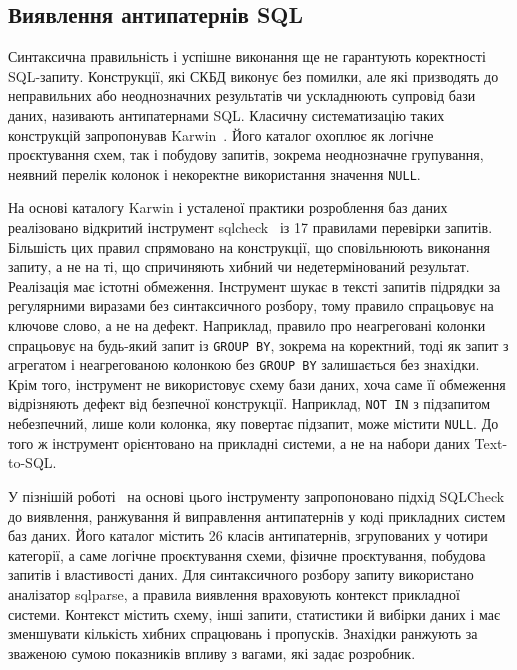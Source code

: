 \documentclass[a4paper,14pt,oneside]{extreport}
\begin{document}
\subsection{Виявлення антипатернів SQL}
\label{subsec:antipatterns}

Синтаксична правильність і успішне виконання ще не гарантують коректності SQL-запиту. Конструкції, які СКБД виконує без помилки, але які призводять до неправильних або неоднозначних результатів чи ускладнюють супровід бази даних, називають антипатернами SQL. Класичну систематизацію таких конструкцій запропонував Karwin~\cite{karwin2010sqlantipatterns}. Його каталог охоплює як логічне проєктування схем, так і побудову запитів, зокрема неоднозначне групування, неявний перелік колонок і некоректне використання значення \texttt{NULL}.

На основі каталогу Karwin і усталеної практики розроблення баз даних реалізовано відкритий інструмент sqlcheck~\cite{sqlcheckRepo} із 17 правилами перевірки запитів. Більшість цих правил спрямовано на конструкції, що сповільнюють виконання запиту, а не на ті, що спричиняють хибний чи недетермінований результат. Реалізація має істотні обмеження. Інструмент шукає в тексті запитів підрядки за регулярними виразами без синтаксичного розбору, тому правило спрацьовує на ключове слово, а не на дефект. Наприклад, правило про неагреговані колонки спрацьовує на будь-який запит із \texttt{GROUP~BY}, зокрема на коректний, тоді як запит з агрегатом і неагрегованою колонкою без \texttt{GROUP~BY} залишається без знахідки. Крім того, інструмент не використовує схему бази даних, хоча саме її обмеження відрізняють дефект від безпечної конструкції. Наприклад, \texttt{NOT~IN} з підзапитом небезпечний, лише коли колонка, яку повертає підзапит, може містити \texttt{NULL}. До того ж інструмент орієнтовано на прикладні системи, а не на набори даних Text-to-SQL.

У пізнішій роботі~\cite{dintyala2020sqlcheck} на основі цього інструменту запропоновано підхід SQLCheck до виявлення, ранжування й виправлення антипатернів у коді прикладних систем баз даних. Його каталог містить 26 класів антипатернів, згрупованих у чотири категорії, а саме логічне проєктування схеми, фізичне проєктування, побудова запитів і властивості даних. Для синтаксичного розбору запиту використано аналізатор sqlparse, а правила виявлення враховують контекст прикладної системи. Контекст містить схему, інші запити, статистики й вибірки даних і має зменшувати кількість хибних спрацювань і пропусків. Знахідки ранжують за зваженою сумою показників впливу з вагами, які задає розробник.
\end{document}
